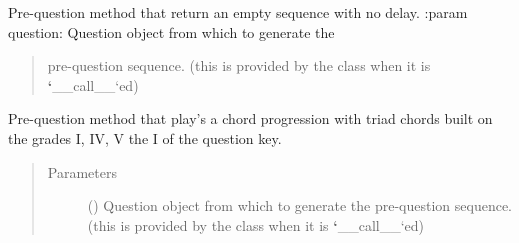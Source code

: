 \documentclass[letterpaper,10pt,english]{sphinxmanual}
\begin{document}

\begin{fulllineitems}
\label{\detokenize{index:birdears.prequestion.none}}
Pre-question method that return an empty sequence with no delay.
:param question: Question object from which to generate the
\begin{quote}

pre-question sequence. (this is provided by the  class
when it is {\color{red}\bfseries{}{}`}\_\_call\_\_{}`ed)
\end{quote}
\begin{quote}\begin{description}
\end{description}\end{quote}

\end{fulllineitems}


\begin{fulllineitems}
\label{\detokenize{index:birdears.prequestion.progression_i_iv_v_i}}
Pre-question method that play’s a chord progression with triad chords
built on the grades I, IV, V the I of the question key.
\begin{quote}\begin{description}
\item[{Parameters}] \leavevmode
{} () \textendash{} Question object from which to generate the
pre-question sequence. (this is provided by the  class
when it is {\color{red}\bfseries{}{}`}\_\_call\_\_{}`ed)

\end{description}\end{quote}

\end{fulllineitems}

\end{document}
